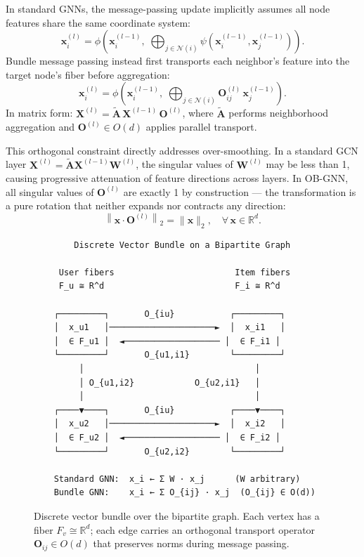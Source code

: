 In standard GNNs, the message-passing update implicitly assumes all node features share the same coordinate system:
\begin{equation}
    \mathbf{x}_i^{(l)} = \phi\!\left(\mathbf{x}_i^{(l-1)},\; \bigoplus_{j \in \mathcal{N}(i)} \psi\!\left(\mathbf{x}_i^{(l-1)}, \mathbf{x}_j^{(l-1)}\right)\right).
\end{equation}
Bundle message passing instead first transports each neighbor's feature into the target node's fiber before aggregation:
\begin{equation}
    \mathbf{x}_i^{(l)} = \phi\!\left(\mathbf{x}_i^{(l-1)},\; \bigoplus_{j \in \mathcal{N}(i)} \mathbf{O}_{ij}^{(l)} \, \mathbf{x}_j^{(l-1)}\right).
\end{equation}
In matrix form: $\mathbf{X}^{(l)} = \tilde{\mathbf{A}} \, \mathbf{X}^{(l-1)} \, \mathbf{O}^{(l)}$, where $\tilde{\mathbf{A}}$ performs neighborhood aggregation and $\mathbf{O}^{(l)} \in O(d)$ applies parallel transport.

This orthogonal constraint directly addresses over-smoothing. In a standard GCN layer $\mathbf{X}^{(l)} = \tilde{\mathbf{A}} \mathbf{X}^{(l-1)} \mathbf{W}^{(l)}$, the singular values of $\mathbf{W}^{(l)}$ may be less than 1, causing progressive attenuation of feature directions across layers. In OB-GNN, all singular values of $\mathbf{O}^{(l)}$ are exactly 1 by construction --- the transformation is a pure rotation that neither expands nor contracts any direction:
\begin{equation}
    \left\|\mathbf{x} \cdot \mathbf{O}^{(l)}\right\|_2 = \|\mathbf{x}\|_2, \quad \forall \, \mathbf{x} \in \mathbb{R}^d.
\end{equation}

\begin{figure}[h]
\centering
\begin{verbatim}
        Discrete Vector Bundle on a Bipartite Graph

     User fibers                        Item fibers
     F_u ≅ R^d                          F_i ≅ R^d

    ┌─────────┐       O_{iu}           ┌─────────┐
    │  x_u1   │─────────────────────►  │  x_i1   │
    │  ∈ F_u1 │  ◄─────────────────── │  ∈ F_i1 │
    └─────────┘       O_{u1,i1}        └─────────┘
         │                                  │
         │ O_{u1,i2}            O_{u2,i1}   │
         │                                  │
    ┌────▼────┐       O_{iu}           ┌────▼────┐
    │  x_u2   │─────────────────────►  │  x_i2   │
    │  ∈ F_u2 │  ◄─────────────────── │  ∈ F_i2 │
    └─────────┘       O_{u2,i2}        └─────────┘

    Standard GNN:  x_i ← Σ W · x_j      (W arbitrary)
    Bundle GNN:    x_i ← Σ O_{ij} · x_j  (O_{ij} ∈ O(d))
\end{verbatim}
\caption{Discrete vector bundle over the bipartite graph. Each vertex has a fiber $F_v \cong \mathbb{R}^d$; each edge carries an orthogonal transport operator $\mathbf{O}_{ij} \in O(d)$ that preserves norms during message passing.}
\label{fig:bundle}
\end{figure}


